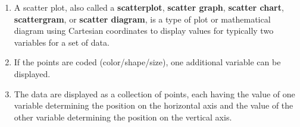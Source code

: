 \begin{enumerate}
    \item A scatter plot, also called a \textbf{scatterplot}, \textbf{scatter graph}\label{Visualizing Data/scatter graph}, \textbf{scatter chart}\label{Visualizing Data/scatter chart}, \textbf{scattergram}\label{Visualizing Data/scattergram}, or \textbf{scatter diagram}\label{Visualizing Data/scatter diagram}, is a type of plot or mathematical diagram using Cartesian coordinates to display values for typically two variables for a set of data. \hfill \cite{wiki/Scatter_plot}
    
    \item If the points are coded (color/shape/size), one additional variable can be displayed. \hfill \cite{wiki/Scatter_plot}
    
    \item The data are displayed as a collection of points, each having the value of one variable determining the position on the horizontal axis and the value of the other variable determining the position on the vertical axis. \hfill \cite{wiki/Scatter_plot}
\end{enumerate}






